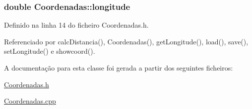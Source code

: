 \hypertarget{class_coordenadas_a328c0d572b3a7d47bfbd866f5d6d6489}{
\subsubsection[{longitude}]{\setlength{\rightskip}{0pt plus 5cm}double Coordenadas\+::longitude\hspace{0.3cm}{\ttfamily [private]}}}\label{class_coordenadas_a328c0d572b3a7d47bfbd866f5d6d6489}


Definido na linha 14 do ficheiro Coordenadas.\+h.



Referenciado por calc\+Distancia(), Coordenadas(), get\+Longitude(), load(), save(), set\+Longitude() e showcoord().



A documentação para esta classe foi gerada a partir dos seguintes ficheiros\+:\begin{DoxyCompactItemize}
\item 
\hyperlink{_coordenadas_8h}{Coordenadas.\+h}\item 
\hyperlink{_coordenadas_8cpp}{Coordenadas.\+cpp}\end{DoxyCompactItemize}
